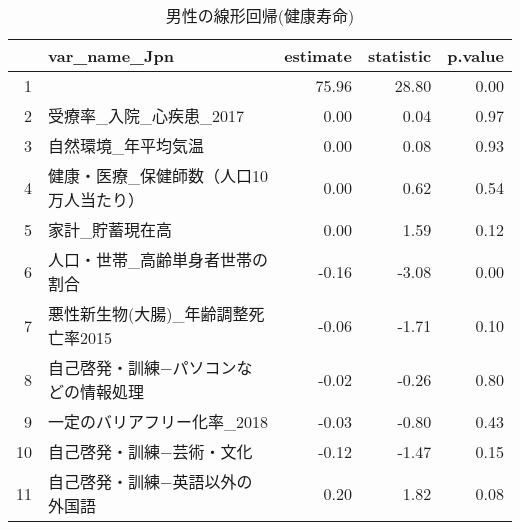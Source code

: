 \begin{table}[ht]
\centering
\caption{男性の線形回帰(健康寿命)} 
\label{UsualHLMLEf}
\begingroup\tiny
\begin{tabular}{rlrrr}
  \hline
 & var\_name\_Jpn & estimate & statistic & p.value \\ 
  \hline
1 &  & 75.96 & 28.80 & 0.00 \\ 
  2 & 受療率\_入院\_心疾患\_2017 & 0.00 & 0.04 & 0.97 \\ 
  3 & 自然環境\_年平均気温 & 0.00 & 0.08 & 0.93 \\ 
  4 & 健康・医療\_保健師数（人口10万人当たり） & 0.00 & 0.62 & 0.54 \\ 
  5 & 家計\_貯蓄現在高 & 0.00 & 1.59 & 0.12 \\ 
  6 & 人口・世帯\_高齢単身者世帯の割合 & -0.16 & -3.08 & 0.00 \\ 
  7 & 悪性新生物(大腸)\_年齢調整死亡率2015 & -0.06 & -1.71 & 0.10 \\ 
  8 & 自己啓発・訓練−パソコンなどの情報処理 & -0.02 & -0.26 & 0.80 \\ 
  9 & 一定のバリアフリー化率\_2018 & -0.03 & -0.80 & 0.43 \\ 
  10 & 自己啓発・訓練−芸術・文化 & -0.12 & -1.47 & 0.15 \\ 
  11 & 自己啓発・訓練−英語以外の外国語 & 0.20 & 1.82 & 0.08 \\ 
   \hline
\end{tabular}
\endgroup
\end{table}
